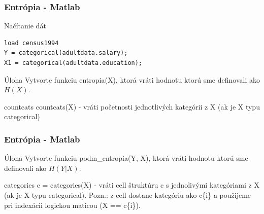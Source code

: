 \documentclass{beamer}
\begin{document}
\begin{frame}[fragile]
\frametitle{Entrópia - Matlab}
\begin{block}{Načítanie dát}
\begin{verbatim}
load census1994
Y = categorical(adultdata.salary);
X1 = categorical(adultdata.education);
\end{verbatim}
\end{block}

\begin{block}{Úloha}
Vytvorte funkciu entropia(X), ktorá vráti hodnotu ktorú sme definovali ako $H(X)$.
\end{block}

\begin{block}{countcats}
countcats(X) - vráti početnosti jednotlivých kategórii z X (ak je X typu categorical)
\end{block}
\end{frame}


\begin{frame}
\frametitle{Entrópia - Matlab}

\begin{block}{Úloha}
Vytvorte funkciu podm\_entropia(Y, X), ktorá vráti hodnotu ktorú sme definovali ako $H(Y|X)$.
\end{block}

\begin{block}{categories}
c = categories(X) - vráti cell štruktúru c s jednolivými kategóriami z X (ak je X typu categorical).  Pozn.: z cell dostane kategóriu ako c\{i\} a použijeme pri indexácii logickou maticou (X == c\{i\}).
\end{block}
\end{frame}
\end{document}
